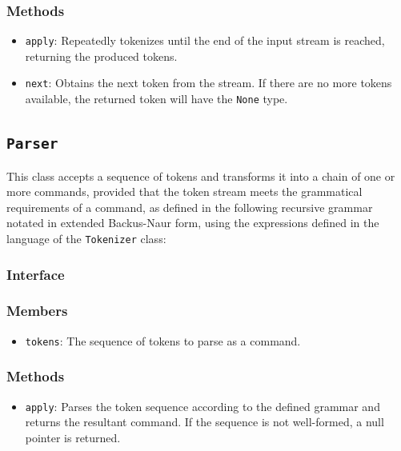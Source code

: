 \documentclass{article}
\begin{document}
  \subsubsection{Methods}
  \begin{itemize}
    \item \texttt{apply}: Repeatedly tokenizes until the end of the
      input stream is reached, returning the produced tokens.
    \item \texttt{next}: Obtains the next token from the stream.  If
      there are no more tokens available, the returned token will have
      the \texttt{None} type.
  \end{itemize}

  \subsection{\texttt{Parser}}

  This class accepts a sequence of tokens and transforms it into a chain
  of one or more commands, provided that the token stream meets the
  grammatical requirements of a command, as defined in the following
  recursive grammar notated in extended Backus-Naur form, using the
  expressions defined in the language of the \texttt{Tokenizer} class:

  

  \subsubsection{Interface}
  

  \subsubsection{Members}
  \begin{itemize}
    \item \texttt{tokens}: The sequence of tokens to parse as a command.
  \end{itemize}

  \subsubsection{Methods}
  \begin{itemize}
    \item \texttt{apply}: Parses the token sequence according to the
      defined grammar and returns the resultant command.  If the
      sequence is not well-formed, a null pointer is returned.
  \end{itemize}
\end{document}
